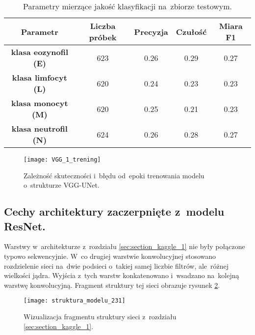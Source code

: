 {\begin{table}[h!]
\centering
\caption[Short Heading]{Parametry mierzące jakość klasyfikacji na~zbiorze testowym.}
\label{tab:VGG_1_params_val}
\begin{tabular}{|c|c|c|c|c|}
\hline
\textbf{Parametr}                            & \textbf{Liczba próbek}   & \textbf{Precyzja} & \textbf{Czułość} & \textbf{Miara F1} \\ \hline
\textbf{klasa eozynofil (E)}& 623  & 0.26   & 0.29   & 0.27  \\ \hline
\textbf{klasa limfocyt (L)}  & 620 & 0.24  & 0.23 & 0.23  \\ \hline
\textbf{klasa monocyt (M)} & 620 & 0.25   & 0.21    & 0.23   \\ \hline
\textbf{klasa neutrofil (N)}  & 624 & 0.26   & 0.28    & 0.27  \\ \hline
\end{tabular}
\end{table}

\begin{figure}[h!]
	\centering
	\centering
		\texttt{[image: VGG\_1\_trening]}	
	\caption{Zależność skuteczności i~błędu od~epoki trenowania modelu o~strukturze VGG-UNet.}
	\label{fig:VGG_1_trening}
\end{figure}
}

\subsection{Cechy architektury zaczerpnięte z~modelu ResNet.}
\label{sec:architektura_resnet}

Warstwy w~architekturze z~rozdziału \ref{sec:section_kaggle_1} nie były połączone typowo sekwencyjnie. W~co drugiej warstwie konwolucyjnej stosowano rozdzielenie sieci na~dwie podsieci o~takiej samej liczbie filtrów, ale~różnej wielkości jądra. Wyjścia z~tych warstw konkatenowano i~wsadzano na~kolejną warstwę konwolucyjną. Fragment struktury tej sieci obrazuje rysunek \ref{fig:struktura_modelu_231}. 


\begin{figure}[h!]
	\centering
	\centering
		\texttt{[image: struktura\_modelu\_231]}	
	\caption{Wizualizacja fragmentu struktury sieci z~rozdziału \ref{sec:section_kaggle_1}.}	\label{fig:struktura_modelu_231}
\end{figure}

